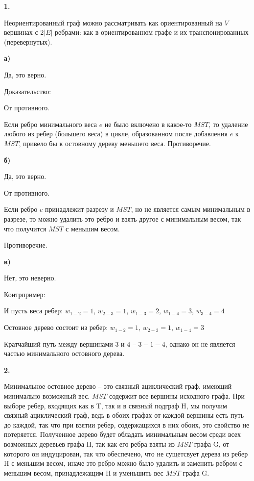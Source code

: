 \documentclass[12pt]{extreport}
\begin{document}
{\bf 1.} 

Неориентированный граф можно рассматривать как ориентированный на $V$ вершинах с $2|E|$ ребрами: как в ориентированном графе и их транспонированных (перевернутых). 

{\bf а)}  

Да, это верно. 

Доказательство: 

От противного. 

Если ребро минимального веса $e$ не было включено в какое-то $MST$, то удаление любого из ребер (большего веса) в цикле, образованном после добавления $e$ к $MST$, привело бы к остовному дереву меньшего веса. 
Противоречие. 

\bigskip 

{\bf б)} 

Да, это верно. 

От противного.

Если ребро $e$ принадлежит разрезу и $MST$, но не является самым минимальным в разрезе, то можно удалить это ребро и взять другое с минимальным весом, так что получится $MST$ с меньшим весом. 

Противоречие. 

\bigskip 

{\bf в)} 

Нет, это неверно.

Контрпример: 


И пусть веса ребер: $w_{1-2} = 1$, $w_{2-3} = 1$, $w_{1-3}=2$, $w_{1-4} = 3$, $w_{3-4}=4$

Остовное дерево состоит из ребер: $w_{1-2} = 1$, $w_{2-3} = 1$, $w_{1-4}=3$

Кратчайший путь между вершинами $3$ и $4$ -- $3-1-4$, однако он не является частью минимального остовного дерева. 

\bigskip 
{\bf 2.} 

Минимальное остовное дерево -- это связный ациклический граф, имеющий минимально возможный вес. $MST$ содержит все вершины исходного графа. При выборе ребер, входящих как в T, так и в связный подграф H, мы получим связный ациклический граф, ведь в обоих графах от каждой вершины есть путь до каждой, так что при взятии ребер, содержащихся в них обоих, это свойство не потеряется. Полученное дерево будет обладать минимальным весом среди всех возможных деревьев графа H, так как его ребра взяты из $MST$ графа G, от которого он индуцирован, так что обеспечено, что не сущетсвует дерева из ребер H с меньшим весом, иначе это ребро можно было удалить и заменить ребром с меньшим весом, принадлежащим H и уменьшить вес $MST$ графа G.
\end{document}
